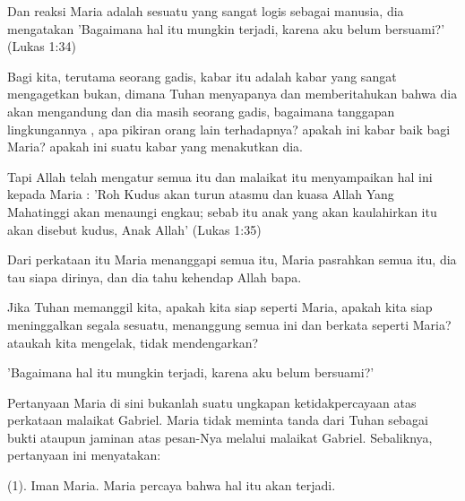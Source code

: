 \documentclass[a5paper,titlepage,12pt]{scrbook}
\begin{document}
\begin{itemize}
\begin{enumerate}[a.]
Dan reaksi Maria adalah sesuatu yang sangat logis sebagai manusia, dia mengatakan 'Bagaimana hal itu mungkin terjadi, karena aku belum bersuami?' (Lukas 1:34) 

Bagi kita, terutama seorang gadis, kabar itu adalah kabar yang sangat mengagetkan bukan, dimana Tuhan menyapanya dan memberitahukan bahwa dia akan mengandung dan dia masih seorang gadis, bagaimana tanggapan lingkungannya , apa pikiran orang lain terhadapnya? apakah ini kabar baik bagi Maria? apakah ini suatu kabar yang menakutkan dia. 

Tapi Allah telah mengatur semua itu dan malaikat itu menyampaikan hal ini kepada Maria : 'Roh Kudus akan turun atasmu dan kuasa Allah Yang Mahatinggi akan menaungi engkau; sebab itu anak yang akan kaulahirkan itu akan disebut kudus, Anak Allah' (Lukas 1:35) 

Dari perkataan itu Maria menanggapi semua itu, Maria pasrahkan semua itu, dia tau siapa dirinya, dan dia tahu kehendap Allah bapa. 

Jika Tuhan memanggil kita, apakah kita siap seperti Maria, apakah kita siap meninggalkan segala sesuatu, menanggung semua ini dan berkata seperti Maria? ataukah kita mengelak, tidak mendengarkan? 

'Bagaimana hal itu mungkin terjadi, karena aku belum bersuami?'

Pertanyaan Maria di sini bukanlah suatu ungkapan ketidakpercayaan atas perkataan malaikat Gabriel. Maria tidak meminta tanda dari Tuhan sebagai bukti ataupun jaminan atas pesan-Nya melalui malaikat Gabriel. Sebaliknya, pertanyaan ini menyatakan:

(1). Iman Maria. Maria percaya bahwa hal itu akan terjadi.


\end{enumerate}
\end{itemize}
\end{document}
